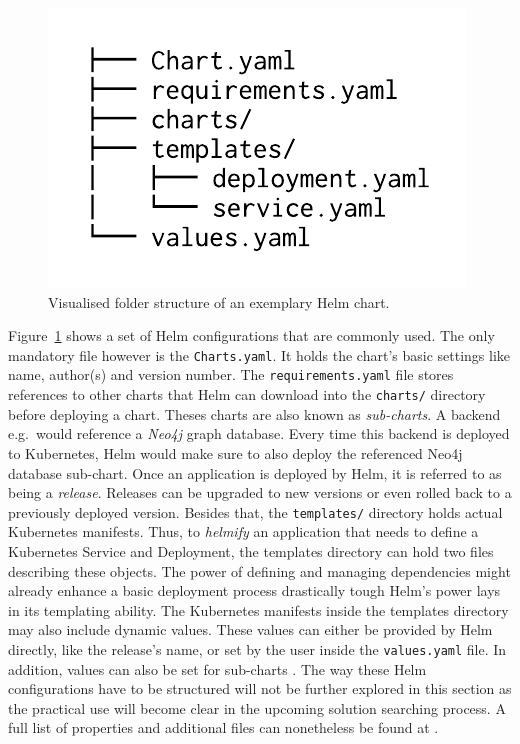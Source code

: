 \begin{figure}[H]
\begin{center}
  \includegraphics[scale=0.8]{images/figures/directory_listing_example_chart.pdf}
\end{center}
\caption{Visualised folder structure of an exemplary Helm chart.}%
\label{fig:helm_chart_folder_example}
\end{figure}

Figure~\ref{fig:helm_chart_folder_example} shows a set of Helm configurations
that are commonly used. The only mandatory file however is the
\texttt{Charts.yaml}. It holds the chart's basic settings like name, author(s)
and version number. The \texttt{requirements.yaml} file stores references to
other charts that Helm can download into the \texttt{charts/} directory before
deploying a chart. Theses charts are also known as \textit{sub-charts}. A
backend e.g.\ would reference a \textit{Neo4j} graph database. Every time this
backend is deployed to Kubernetes, Helm would make sure to also deploy the
referenced Neo4j database sub-chart. Once an application is deployed by Helm,
it is referred to as being a \textit{release}. Releases can be upgraded to new
versions or even rolled back to a previously deployed version. Besides that,
the \texttt{templates/} directory holds actual Kubernetes manifests. Thus, to
\textit{helmify} an application that needs to define a Kubernetes Service and
Deployment, the templates directory can hold two files describing these
objects. The power of defining and managing dependencies might already enhance
a basic deployment process drastically tough Helm's power lays in its
templating ability. The Kubernetes manifests inside the templates directory may
also include dynamic values. These values can either be provided by Helm
directly, like the release's name, or set by the user inside the
\texttt{values.yaml} file. In addition, values can also be set for sub-charts
\autocite{HelmDocumentationCharts}. The way these Helm configurations have to
be structured will not be further explored in this section as the practical use
will become clear in the upcoming solution searching process. A full list of
properties and additional files can nonetheless be found at
\autocite{HelmDocumentationCharts}.

